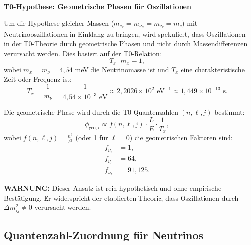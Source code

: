 	\begin{speculation}
		\textbf{T0-Hypothese: Geometrische Phasen für Oszillationen}
		
		Um die Hypothese gleicher Massen ($m_{\nu_e} = m_{\nu_\mu} = m_{\nu_\tau} = m_\nu$) mit Neutrinooszillationen in Einklang zu bringen, wird spekuliert, dass Oszillationen in der T0-Theorie durch geometrische Phasen und nicht durch Massendifferenzen verursacht werden. Dies basiert auf der T0-Relation:
		\[
		T_x \cdot m_x = 1,
		\]
		wobei $m_x = m_\nu = 4,54$ meV die Neutrinomasse ist und $T_x$ eine charakteristische Zeit oder Frequenz ist:
		\[
		T_x = \frac{1}{m_\nu} = \frac{1}{4,54 \times 10^{-3} \text{ eV}} \approx 2,2026 \times 10^2 \text{ eV}^{-1} \approx 1,449 \times 10^{-13} \text{ s}.
		\]
		
		Die geometrische Phase wird durch die T0-Quantenzahlen $(n, \ell, j)$ bestimmt:
		\[
		\phi_{\text{geo}, i} \propto f(n, \ell, j) \cdot \frac{L}{E} \cdot \frac{1}{T_x},
		\]
		wobei $f(n, \ell, j) = \frac{n^6}{\ell^3}$ (oder 1 für $\ell = 0$) die geometrischen Faktoren sind:
		\begin{align}
			f_{\nu_e} &= 1, \\
			f_{\nu_\mu} &= 64, \\
			f_{\nu_\tau} &= 91,125.
		\end{align}
		
		\textbf{WARNUNG:} Dieser Ansatz ist rein hypothetisch und ohne empirische Bestätigung. Er widerspricht der etablierten Theorie, dass Oszillationen durch $\Delta m^2_{ij} \neq 0$ verursacht werden.
	\end{speculation}
	
	\subsection{Quantenzahl-Zuordnung für Neutrinos}
	
	\begin{table}[h]
		\centering
		\caption{Spekulative T0-Quantenzahlen für Neutrino-Flavours}
	\end{table}
	
